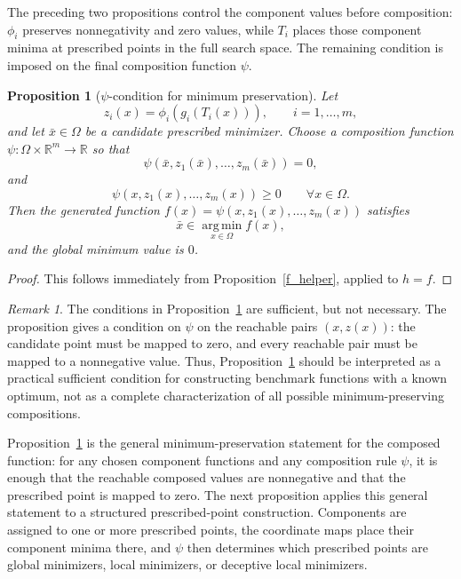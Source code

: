 \documentclass[journal]{IEEEtran}
\theoremstyle{remark}
\newtheorem{remark}{Remark}
\theoremstyle{plain}
\newtheorem{proposition}{Proposition}
\begin{document}
The preceding two propositions control the component values before composition:
\(\phi_i\) preserves nonnegativity and zero values, while \(T_i\) places those
component minima at prescribed points in the full search space. The remaining
condition is imposed on the final composition function \(\psi\).

\begin{proposition}[\(\psi\)-condition for minimum preservation]
	\label{thm:general-minimum-preservation}
	Let
	\[
	z_i(x)
	=
	\phi_i(g_i(T_i(x))),
	\qquad i=1,\ldots,m,
	\]
	and let \(\bar x\in\Omega\) be a candidate prescribed minimizer. Choose a
	composition function \(\psi:\Omega\times\mathbb{R}^m\to\mathbb{R}\) so that
	\[
	\psi(\bar x,z_1(\bar x),\ldots,z_m(\bar x))=0,
	\]
	and
	\[
	\psi(x,z_1(x),\ldots,z_m(x))\ge0
	\qquad
	\forall x\in\Omega.
	\]
	Then the generated function \(f(x)=\psi(x,z_1(x),\ldots,z_m(x))\) satisfies
	\[
	\bar x\in\operatorname*{arg\,min}_{x\in\Omega} f(x),
	\]
	and the global minimum value is \(0\).
\end{proposition}

\begin{proof}
	This follows immediately from Proposition~\ref{f_helper}, applied to
	\(h=f\). 
\end{proof}

\begin{remark}
	The conditions in Proposition~\ref{thm:general-minimum-preservation} are
	sufficient, but not necessary. The proposition gives a condition on
	\(\psi\) on the reachable pairs \((x,z(x))\): the candidate point must be
	mapped to zero, and every reachable pair must be mapped to a nonnegative
	value. Thus, Proposition~\ref{thm:general-minimum-preservation} should be
	interpreted as a practical sufficient condition for constructing benchmark
	functions with a known optimum, not as a complete characterization of all
	possible minimum-preserving compositions.
\end{remark}

Proposition~\ref{thm:general-minimum-preservation} is the general
minimum-preservation statement for the composed function: for any chosen
component functions and any composition rule \(\psi\), it is enough that the
reachable composed values are nonnegative and that the prescribed point is
mapped to zero. The next proposition applies this general statement to a
structured prescribed-point construction. Components are assigned to one or
more prescribed points, the coordinate maps place their component minima there,
and \(\psi\) then determines which prescribed points are global minimizers,
local minimizers, or deceptive local minimizers.
\end{document}
